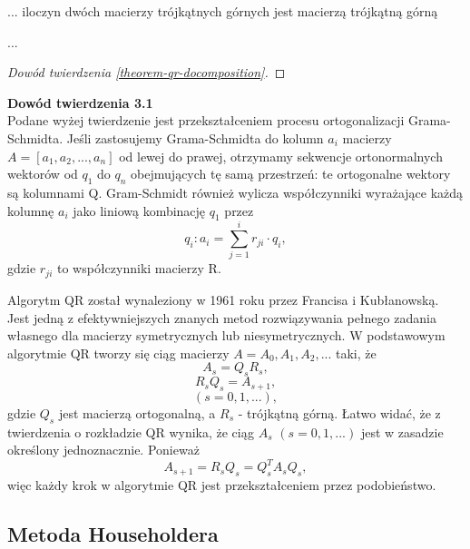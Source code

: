 \documentclass[10pt,a4paper]{report}
\begin{document}
\begin{lemma}
... iloczyn dwóch macierzy trójkątnych górnych jest macierzą trójkątną górną
\end{lemma}

\begin{lemma}
...
\end{lemma}

\begin{lemma}

\end{lemma}

\begin{proof}[Dowód twierdzenia \ref{theorem-qr-docomposition}]

\end{proof}

\noindent \textbf{Dowód twierdzenia 3.1}\\
Podane wyżej twierdzenie jest przekształceniem
procesu ortogonalizacji Grama-Schmidta. Jeśli zastosujemy Grama-Schmidta do kolumn $a_{i}$ macierzy
 $A = [a_{1}, a_{2}, ..., a_{n}]$ od lewej do prawej, otrzymamy
sekwencje ortonormalnych wektorów od $q_{1}$ do $q_{n}$ obejmujących tę samą przestrzeń:
te ortogonalne wektory są kolumnami Q. Gram-Schmidt również wylicza
współczynniki wyrażające każdą kolumnę $a_{i}$
 jako liniową kombinację $q_{1}$ przez 
 $$q_{i}: a_{i}= \sum_{j=1}^i r_{ji}\cdot q_{i}, $$ 
 gdzie $r_{ji}$ to współczynniki macierzy R.
 



Algorytm QR został wynaleziony w 1961 roku przez Francisa i Kubłanowską. Jest jedną z efektywniejszych znanych metod rozwiązywania pełnego zadania własnego dla macierzy symetrycznych lub niesymetrycznych.
W podstawowym algorytmie QR tworzy się ciąg macierzy $A= A_{0}, A_{1}, A_{2}, ...$ taki, że 
$$ A_{s}=Q_{s}R_{s},$$
$$R_{s}Q_{s}=A_{s+1},$$
$$(s=0, 1, ...),$$ 
gdzie $Q_{s}$ jest macierzą ortogonalną, a $R_{s}$ - trójkątną górną. Łatwo widać, że z twierdzenia o rozkładzie QR wynika, że ciąg $A_{s}$ $(s=0, 1, ...)$ jest w zasadzie określony jednoznacznie. Ponieważ 
$$ A_{s+1}=R_{s}Q_{s}=Q_{s}^{T}A_{s}Q_{s},$$ 
więc każdy krok w algorytmie QR jest przekształceniem przez podobieństwo. 

\subsection*{Metoda Householdera}
\end{document}
